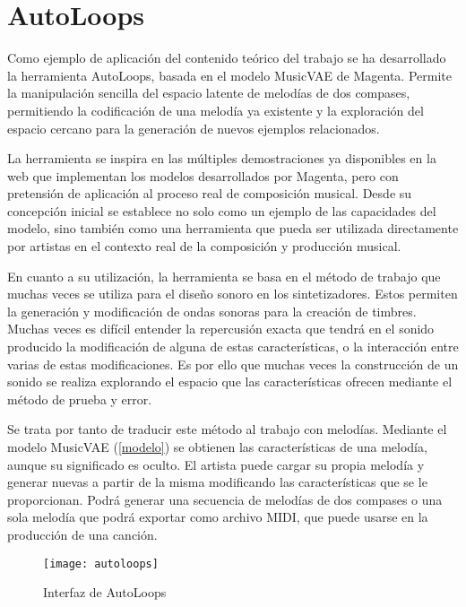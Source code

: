 
\chapter{AutoLoops}

Como ejemplo de aplicación del contenido teórico del trabajo se ha desarrollado la herramienta AutoLoops, basada en el modelo MusicVAE de Magenta. Permite la manipulación sencilla del espacio latente de melodías de dos compases, permitiendo la codificación de una melodía ya existente y la exploración del espacio cercano para la generación de nuevos ejemplos relacionados.

La herramienta se inspira en las múltiples demostraciones ya  disponibles en la web que implementan los modelos desarrollados por Magenta, pero con pretensión de aplicación al proceso real de composición musical. Desde su concepción inicial se establece no solo como un ejemplo de las capacidades del modelo, sino también como una herramienta que pueda ser utilizada directamente por artistas en el contexto real de la composición y producción musical.

En cuanto a su utilización, la herramienta se basa en el método de trabajo que muchas veces se utiliza para el diseño sonoro en los sintetizadores. Estos permiten la generación y modificación de ondas sonoras para la creación de timbres. Muchas veces es difícil entender la repercusión exacta que tendrá en el sonido producido la modificación de alguna de estas características, o la interacción entre varias de estas modificaciones. Es por ello que muchas veces la construcción de un sonido se realiza explorando el espacio que las características ofrecen mediante el método de prueba y error.

Se trata por tanto de traducir este método al trabajo con melodías. Mediante el modelo MusicVAE (\autoref{modelo}) se obtienen las características de una melodía, aunque su significado es oculto. El artista puede cargar su propia melodía y generar nuevas a partir de la misma modificando las características que se le proporcionan. Podrá generar una secuencia de melodías de dos compases o una sola melodía que podrá exportar como archivo MIDI, que puede usarse en la producción de una canción.

\begin{figure}[htpb]
  \centering
  \texttt{[image: autoloops]}
  \caption{Interfaz de AutoLoops}
  \label{fig:autoloops}
\end{figure}

